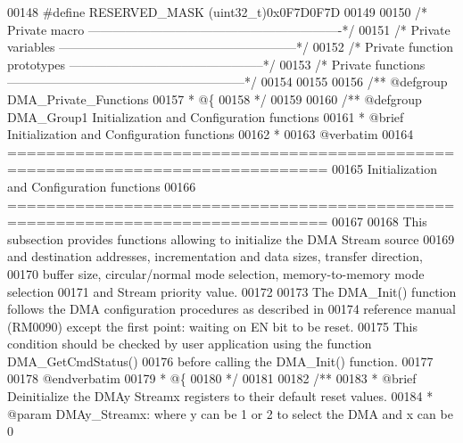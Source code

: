 \begin{DoxyCode}
00148 \textcolor{preprocessor}{#}\textcolor{preprocessor}{define} \textcolor{preprocessor}{RESERVED\_MASK}           \textcolor{preprocessor}{(}\textcolor{preprocessor}{uint32\_t}\textcolor{preprocessor}{)}0x0F7D0F7D
00149 
00150 \textcolor{comment}{/* Private macro -------------------------------------------------------------*/}
00151 \textcolor{comment}{/* Private variables ---------------------------------------------------------*/}
00152 \textcolor{comment}{/* Private function prototypes -----------------------------------------------*/}
00153 \textcolor{comment}{/* Private functions ---------------------------------------------------------*/}
00154 
00155 
00156 \textcolor{comment}{/** @defgroup DMA\_Private\_Functions}
00157 \textcolor{comment}{  * @\{}
00158 \textcolor{comment}{  */}
00159 
00160 \textcolor{comment}{/** @defgroup DMA\_Group1 Initialization and Configuration functions}
00161 \textcolor{comment}{ *  @brief   Initialization and Configuration functions}
00162 \textcolor{comment}{ *}
00163 \textcolor{comment}{@verbatim   }
00164 \textcolor{comment}{ ===============================================================================}
00165 \textcolor{comment}{                 Initialization and Configuration functions}
00166 \textcolor{comment}{ ===============================================================================  }
00167 \textcolor{comment}{}
00168 \textcolor{comment}{  This subsection provides functions allowing to initialize the DMA Stream source}
00169 \textcolor{comment}{  and destination addresses, incrementation and data sizes, transfer direction, }
00170 \textcolor{comment}{  buffer size, circular/normal mode selection, memory-to-memory mode selection }
00171 \textcolor{comment}{  and Stream priority value.}
00172 \textcolor{comment}{  }
00173 \textcolor{comment}{  The DMA\_Init() function follows the DMA configuration procedures as described in}
00174 \textcolor{comment}{  reference manual (RM0090) except the first point: waiting on EN bit to be reset.}
00175 \textcolor{comment}{  This condition should be checked by user application using the function DMA\_GetCmdStatus()}
00176 \textcolor{comment}{  before calling the DMA\_Init() function.}
00177 \textcolor{comment}{}
00178 \textcolor{comment}{@endverbatim}
00179 \textcolor{comment}{  * @\{}
00180 \textcolor{comment}{  */}
00181 
00182 \textcolor{comment}{/**}
00183 \textcolor{comment}{  * @brief  Deinitialize the DMAy Streamx registers to their default reset values.}
00184 \textcolor{comment}{  * @param  DMAy\_Streamx: where y can be 1 or 2 to select the DMA and x can be 0}

\end{DoxyCode}
